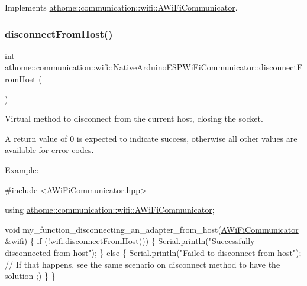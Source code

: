Implements \mbox{\hyperlink{classathome_1_1communication_1_1wifi_1_1_a_wi_fi_communicator_a6131240ac0daa0f9fb4d46871feea4c2}{athome\+::communication\+::wifi\+::\+A\+Wi\+Fi\+Communicator}}.

\mbox{\label{classathome_1_1communication_1_1wifi_1_1_native_arduino_e_s_p_wi_fi_communicator_a8fa44a5078cb7d61f01b306e1d0d1bfe}} 
\subsubsection{\texorpdfstring{disconnect\+From\+Host()}{disconnectFromHost()}}
{\footnotesize\ttfamily int athome\+::communication\+::wifi\+::\+Native\+Arduino\+E\+S\+P\+Wi\+Fi\+Communicator\+::disconnect\+From\+Host (\begin{DoxyParamCaption}{ }\end{DoxyParamCaption})\hspace{0.3cm}{\ttfamily [virtual]}}

Virtual method to disconnect from the current host, closing the socket.

A return value of 0 is expected to indicate success, otherwise all other values are available for error codes.

Example\+:


\begin{DoxyCode}
\textcolor{preprocessor}{#include <AWiFiCommunicator.hpp>}

\textcolor{keyword}{using} \mbox{\hyperlink{classathome_1_1communication_1_1wifi_1_1_a_wi_fi_communicator}{athome::communication::wifi::AWiFiCommunicator}};

\textcolor{keywordtype}{void} my\_function\_disconnecting\_an\_adapter\_from\_host(\mbox{\hyperlink{classathome_1_1communication_1_1wifi_1_1_a_wi_fi_communicator_a0098148fe8d0eeee99b7f8f72a72a900}{AWiFiCommunicator}} &wifi) \{
  \textcolor{keywordflow}{if} (!wifi.disconnectFromHost()) \{
    Serial.println(\textcolor{stringliteral}{"Successfully disconnected from host"});
  \} \textcolor{keywordflow}{else} \{
    Serial.println(\textcolor{stringliteral}{"Failed to disconnect from host"}); \textcolor{comment}{// If that happens, see the same scenario on
       disconnect method to have the solution ;)}
  \}
\}
\end{DoxyCode}
 

